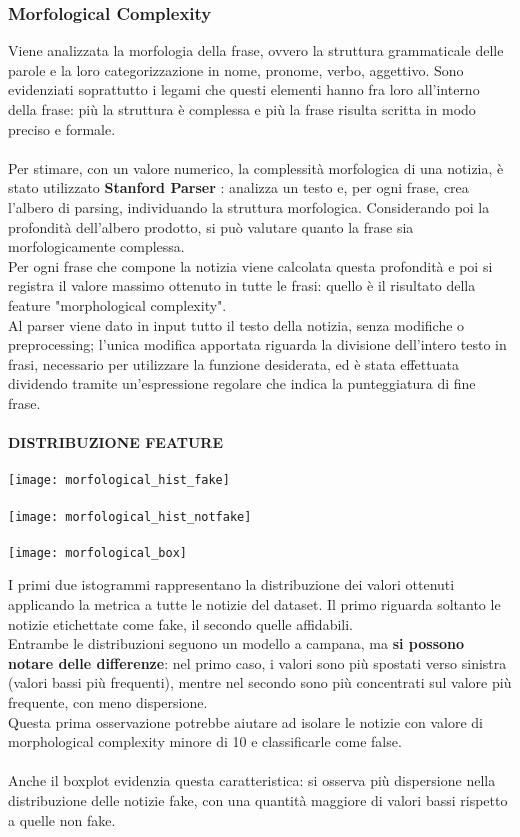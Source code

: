 \documentclass{article}
\begin{document}
\begin{multicols}{2}
				\subsubsection{Morfological Complexity}
					Viene analizzata la morfologia della frase, ovvero la struttura grammaticale delle parole e la loro categorizzazione in nome, pronome, verbo, aggettivo. Sono evidenziati soprattutto i legami che questi elementi hanno fra loro all'interno della frase: più la struttura è complessa e più la frase risulta scritta in modo preciso e formale.\\~\\
					Per stimare, con un valore numerico, la complessità morfologica di una notizia, è stato utilizzato \textbf{Stanford Parser} \cite{stanfordparser}: analizza un testo e, per ogni frase, crea l'albero di parsing, individuando la struttura morfologica. Considerando poi la profondità dell'albero prodotto, si può valutare quanto la frase sia morfologicamente complessa.\\
					Per ogni frase che compone la notizia viene calcolata questa profondità e poi si registra il valore massimo ottenuto in tutte le frasi: quello è il risultato della feature "morphological complexity".\\
					Al parser viene dato in input tutto il testo della notizia, senza modifiche o preprocessing; l'unica modifica apportata riguarda la divisione dell'intero testo in frasi, necessario per utilizzare la funzione desiderata, ed è stata effettuata dividendo tramite un'espressione regolare che indica la punteggiatura di fine frase.
					\\~\\
					\textbf{DISTRIBUZIONE FEATURE}
					\\~\\
					\texttt{[image: morfological\_hist\_fake]}
					\\~\\
					\texttt{[image: morfological\_hist\_notfake]}
					\\~\\
					\texttt{[image: morfological\_box]}
					
					I primi due istogrammi rappresentano la distribuzione dei valori ottenuti applicando la metrica a tutte le notizie del dataset. Il primo riguarda soltanto le notizie etichettate come fake, il secondo quelle affidabili.\\
					Entrambe le distribuzioni seguono un modello a campana, ma \textbf{si possono notare delle differenze}: nel primo caso, i valori sono più spostati verso sinistra (valori bassi più frequenti), mentre nel secondo sono più concentrati sul valore più frequente, con meno dispersione.\\
					Questa prima osservazione potrebbe aiutare ad isolare le notizie con valore di morphological complexity minore di 10 e classificarle come false.
					\\~\\
					Anche il boxplot evidenzia questa caratteristica: si osserva più dispersione nella distribuzione delle notizie fake, con una quantità maggiore di valori bassi rispetto a quelle non fake.
					

\end{multicols}
\end{document}
